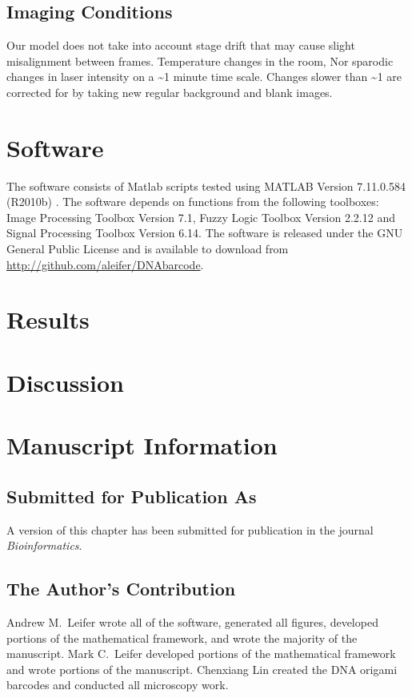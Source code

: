\subsection{Imaging Conditions}
Our model does not take into account stage drift that may cause slight misalignment between frames. 
Temperature changes in the room, Nor sparodic changes in laser intensity on a \textasciitilde1 minute time scale. Changes slower than \textasciitilde1 are corrected for by taking new regular background and blank images.
 
\section{Software}
The software consists of Matlab scripts tested using MATLAB Version 7.11.0.584 (R2010b) \citep{matlab_version_2010}. The software depends on functions from the following toolboxes: Image Processing Toolbox Version 7.1, Fuzzy Logic Toolbox Version 2.2.12 and Signal Processing Toolbox Version 6.14. The software is released under the GNU General Public License and is available to download from \url{http://github.com/aleifer/DNAbarcode}.

\section{Results}

\section{Discussion}


\section{Manuscript Information}
\subsection{Submitted for Publication As}
A version of this chapter has been submitted for publication in the journal \textit{Bioinformatics}.

\subsection{The Author's Contribution}
Andrew M.~Leifer wrote all of the software, generated all figures, developed portions of the mathematical framework, and wrote the majority of the manuscript. Mark C.~Leifer developed portions of the mathematical framework and wrote portions of the manuscript. Chenxiang Lin created the DNA origami barcodes and conducted all microscopy work. 
 